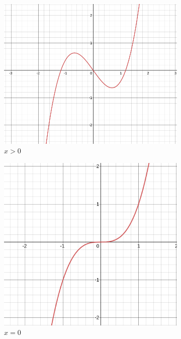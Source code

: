 \documentclass{article}
\begin{document}
\begin{figure}[H]
\centering
\begin{subfigure}[b]{40mm}
\includegraphics[scale=0.15]{figures/hP.png}
\caption{$x > 0$}
\label{fig:}
\end{subfigure}
\begin{subfigure}[b]{40mm}
\includegraphics[scale=0.18]{figures/h0.png}
\caption{$x = 0$}
\label{fig:}
\end{subfigure}
\begin{subfigure}[b]{40mm}

\end{subfigure}
\end{figure}
\end{document}
